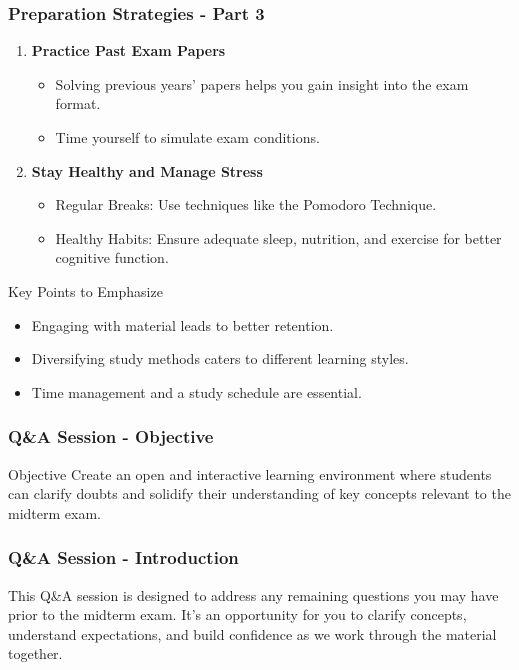 \documentclass[aspectratio=169]{beamer}
\begin{document}
\begin{frame}[fragile]
    \frametitle{Preparation Strategies - Part 3}
    \begin{enumerate}[resume]
        \item \textbf{Practice Past Exam Papers}
        \begin{itemize}
            \item Solving previous years' papers helps you gain insight into the exam format.
            \item Time yourself to simulate exam conditions.
        \end{itemize}

        \item \textbf{Stay Healthy and Manage Stress}
        \begin{itemize}
            \item Regular Breaks: Use techniques like the Pomodoro Technique.
            \item Healthy Habits: Ensure adequate sleep, nutrition, and exercise for better cognitive function.
        \end{itemize}
    \end{enumerate}
    \begin{block}{Key Points to Emphasize}
        \begin{itemize}
            \item Engaging with material leads to better retention.
            \item Diversifying study methods caters to different learning styles.
            \item Time management and a study schedule are essential.
        \end{itemize}
    \end{block}
\end{frame}

\begin{frame}[fragile]
    \frametitle{Q\&A Session - Objective}
    \begin{block}{Objective}
        Create an open and interactive learning environment where students can clarify doubts and solidify their understanding of key concepts relevant to the midterm exam. 
    \end{block}
\end{frame}

\begin{frame}[fragile]
    \frametitle{Q\&A Session - Introduction}
    This Q\&A session is designed to address any remaining questions you may have prior to the midterm exam. It's an opportunity for you to clarify concepts, understand expectations, and build confidence as we work through the material together.
\end{frame}
\end{document}
